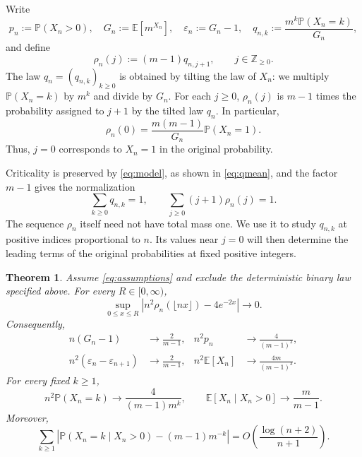 \documentclass[11pt,letterpaper,reqno]{amsart}
\numberwithin{equation}{section}
\theoremstyle{plain}
\newtheorem{theorem}{Theorem}[section]
\theoremstyle{remark}
\newcommand{\E}{\mathbb E}\newcommand{\Pp}{\mathbb P}
\newcommand{\Zp}{\mathbb Z_{\ge0}}
\newcommand{\floor}[1]{\lfloor#1\rfloor}
\begin{document}
Write
\begin{equation}\label{eq:notation}
 p_n:=\Pp(X_n>0),\quad G_n:=\E[m^{X_n}],\quad \varepsilon_n:=G_n-1,\quad 
 q_{n,k}:=\frac{m^k\Pp(X_n=k)}{G_n},
\end{equation}
and define
\begin{equation}\label{eq:rho}
 \rho_n(j):=(m-1)q_{n,j+1},\qquad j\in\Zp.
\end{equation}
The law $q_n=(q_{n,k})_{k\ge0}$ is obtained by tilting the law of $X_n$: we multiply $\Pp(X_n=k)$ by $m^k$ and divide by $G_n$. For each $j\ge0$, $\rho_n(j)$ is $m-1$ times the probability assigned to $j+1$ by the tilted law $q_n$. In particular,
\[
 \rho_n(0)=\frac{m(m-1)}{G_n}\Pp(X_n=1).
\]
Thus, $j=0$ corresponds to $X_n = 1$ in the original probability.

Criticality is preserved by \eqref{eq:model}, as shown in \eqref{eq:qmean}, and the factor $m-1$ gives the normalization
\[
 \sum_{k\ge0}q_{n,k}=1,\qquad
 \sum_{j\ge0}(j+1)\rho_n(j)=1.
\]
The sequence $\rho_n$ itself need not have total mass one. We use it to study $q_{n,k}$ at positive indices proportional to $n$. Its values near $j=0$ will then determine the leading terms of the original probabilities at fixed positive integers.

\begin{theorem}\label{thm:profile}
Assume \eqref{eq:assumptions} and exclude the deterministic binary law specified above. For every $R\in[0,\infty)$,
\begin{equation}\label{eq:mainprofile}
 \sup_{0\le x\le R}\left|n^2\rho_n(\floor{nx})-4e^{-2x}\right|\longrightarrow0.
\end{equation}
Consequently,
\begin{align}
 n(G_n-1)&\longrightarrow\frac2{m-1}, &
 n^2p_n&\longrightarrow\frac4{(m-1)^2},\label{eq:main1}\\
 n^2(\varepsilon_n-\varepsilon_{n+1})&\longrightarrow\frac2{m-1}, &
 n^2\E[X_n]&\longrightarrow\frac{4m}{(m-1)^3}.\label{eq:main2}
\end{align}
For every fixed $k\ge1$,
\begin{equation}\label{eq:atoms}
 n^2\Pp(X_n=k)\longrightarrow \frac4{(m-1)m^k},\qquad
 \E[X_n\mid X_n>0]\longrightarrow\frac m{m-1}.
\end{equation}
Moreover,
\begin{equation}\label{eq:tv}
 \sum_{k\ge1}\left|\Pp(X_n=k\mid X_n>0)-(m-1)m^{-k}\right|
 =O\left(\frac{\log(n+2)}{n+1}\right).
\end{equation}
\end{theorem}
\end{document}
